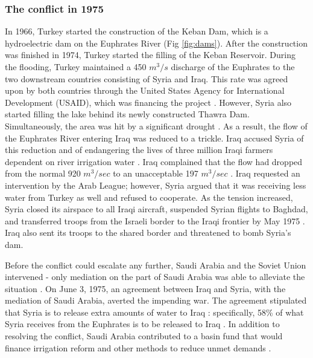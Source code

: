 \documentclass[letterpaper,12pt,titlepage,oneside,final]{book}
\begin{document}
\subsubsection{The conflict in 1975}
In 1966, Turkey started the construction of the Keban Dam, which is a hydroelectric dam on the Euphrates River (Fig \ref{fig:dams}). After the construction was finished in 1974, Turkey started the filling of the Keban Reservoir. During the flooding, Turkey maintained a 450 $m^3/s$ discharge of the Euphrates to the two downstream countries consisting of Syria and Iraq. This rate was agreed upon by both countries through the United States Agency for International Development (USAID), which was financing the project \citep{inan2000law}. However, Syria also started filling the lake behind its newly constructed Thawra Dam. Simultaneously, the area was hit by a significant drought \citep{kalpakian2004identity}. As a result, the flow of the Euphrates River entering Iraq was reduced to a trickle. Iraq accused Syria of this reduction and of endangering the lives of three million Iraqi farmers dependent on river irrigation water \citep{morris1997water}. Iraq complained that the flow had dropped from the normal 920 $m^3/sec$ to an unacceptable 197 $m^3/sec$ \citep{priscoli2009managing}. Iraq requested an intervention by the Arab League; however, Syria argued that it was receiving less water from Turkey as well and refused to cooperate. As the tension increased, Syria closed its airspace to all Iraqi aircraft, suspended Syrian flights to Baghdad, and transferred troops from the Israeli border to the Iraqi frontier by May 1975 \citep{morris1997water}. Iraq also sent its troops to the shared border and threatened to bomb Syria's dam. 

Before the conflict could escalate any further, Saudi Arabia and the Soviet Union intervened - only mediation on the part of Saudi Arabia was able to alleviate the situation \citep{priscoli2009managing}. On June 3, 1975, an agreement between Iraq and Syria, with the mediation of Saudi Arabia, averted the impending war. The agreement stipulated that Syria is to release extra amounts of water to Iraq \citep{akanda2007tigris}: specifically, 58\% of what Syria receives from the Euphrates is to be released to Iraq \citep{priscoli2009managing}. In addition to resolving the conflict, Saudi Arabia contributed to a basin fund that would finance irrigation reform and other methods to reduce unmet demands \citep{akanda2007tigris}.
\end{document}

